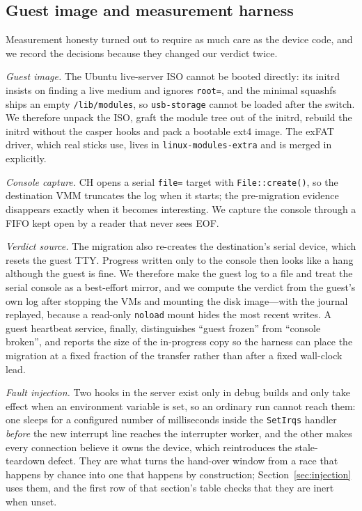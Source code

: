 \documentclass[10pt,conference]{IEEEtran}
\newcommand{\code}[1]{\texttt{#1}}
\begin{document}
\subsection{Guest image and measurement harness}
Measurement honesty turned out to require as much care as the device code, and
we record the decisions because they changed our verdict twice.

\emph{Guest image.} The Ubuntu live-server ISO cannot be booted directly: its
initrd insists on finding a live medium and ignores \code{root=}, and the
minimal squashfs ships an empty \code{/lib/modules}, so \code{usb-storage}
cannot be loaded after the switch. We therefore unpack the ISO, graft the
module tree out of the initrd, rebuild the initrd without the casper hooks and
pack a bootable ext4 image. The exFAT driver, which real sticks use, lives in \code{linux-modules-extra} and is merged in explicitly.

\emph{Console capture.} CH opens a serial \code{file=} target with
\code{File::create()}, so the destination VMM truncates the log when it starts;
the pre-migration evidence disappears exactly when it becomes interesting. We
capture the console through a FIFO kept open by a reader that never sees EOF.

\emph{Verdict source.} The migration also re-creates the destination's serial
device, which resets the guest TTY. Progress written only to the console then
looks like a hang although the guest is fine. We therefore make the guest log
to a file and treat the serial console as a best-effort mirror, and we compute
the verdict from the guest's own log after stopping the VMs and mounting the
disk image---with the journal replayed, because a read-only \code{noload} mount
hides the most recent writes. A guest heartbeat service, finally, distinguishes
``guest frozen'' from ``console broken'', and reports the size of the in-progress
copy so the harness can place the migration at a fixed fraction of the transfer
rather than after a fixed wall-clock lead.

\emph{Fault injection.} Two hooks in the server exist only in debug builds and
only take effect when an environment variable is set, so an ordinary run cannot
reach them: one sleeps for a configured number of milliseconds inside the
\code{SetIrqs} handler \emph{before} the new interrupt line reaches the
interrupter worker, and the other makes every connection believe it owns the
device, which reintroduces the stale-teardown defect. They are what turns the
hand-over window from a race that happens by chance into one that happens by
construction; Section~\ref{sec:injection} uses them, and the first row of that
section's table checks that they are inert when unset.
\end{document}
